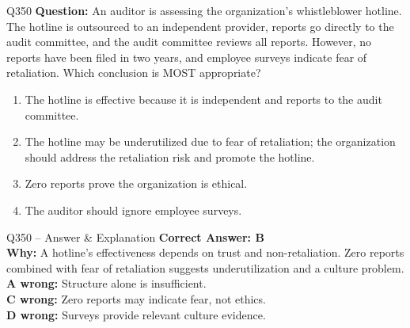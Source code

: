 \documentclass[aspectratio=169,10pt]{beamer}
\begin{document}
	\begin{frame}[t]{Q350}
		\small
		\textbf{Question:} An auditor is assessing the organization's whistleblower hotline. The hotline is outsourced to an independent provider, reports go directly to the audit committee, and the audit committee reviews all reports. However, no reports have been filed in two years, and employee surveys indicate fear of retaliation. Which conclusion is MOST appropriate?
		\begin{enumerate}[label=\Alph*.,itemsep=1pt,topsep=2pt]
			\item The hotline is effective because it is independent and reports to the audit committee.
			\item The hotline may be underutilized due to fear of retaliation; the organization should address the retaliation risk and promote the hotline.
			\item Zero reports prove the organization is ethical.
			\item The auditor should ignore employee surveys.
		\end{enumerate}
	\end{frame}
	
	\begin{frame}[t]{Q350 -- Answer \& Explanation}
		\small
		\textbf{Correct Answer: B} \\[4pt]
		\textbf{Why:} A hotline's effectiveness depends on trust and non-retaliation. Zero reports combined with fear of retaliation suggests underutilization and a culture problem. \\[4pt]
		\textbf{A wrong:} Structure alone is insufficient. \\[2pt]
		\textbf{C wrong:} Zero reports may indicate fear, not ethics. \\[2pt]
		\textbf{D wrong:} Surveys provide relevant culture evidence.
	\end{frame}
	
\end{document}
